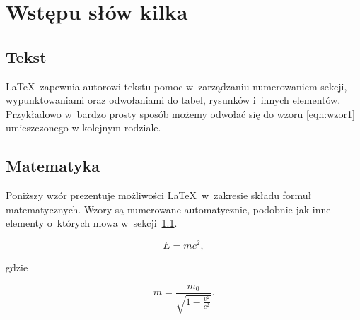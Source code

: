 \chapter{Wstępu słów kilka}

\section{Tekst}
\label{sec:tekst}
\LaTeX\ zapewnia autorowi tekstu pomoc w~zarządzaniu numerowaniem sekcji, wypunktowaniami oraz odwołaniami do tabel, rysunków i~innych elementów. \\
Przykładowo w~bardzo prosty sposób możemy odwołać się do wzoru \ref{eqn:wzor1} umieszczonego w kolejnym rodziale.

\section{Matematyka}
\label{sec:matematyka}
Poniższy wzór prezentuje możliwości \LaTeX\ w~zakresie składu formuł matematycznych. Wzory są numerowane automatycznie, podobnie jak inne elementy o~których mowa w~sekcji~\ref{sec:tekst}.

\begin{equation}
    E = mc^2,
    \label{eqn:wzor1}
\end{equation}

gdzie

\begin{equation}
    m = \frac{m_0}{\sqrt{1-\frac{v^2}{c^2}}}.
\end{equation}